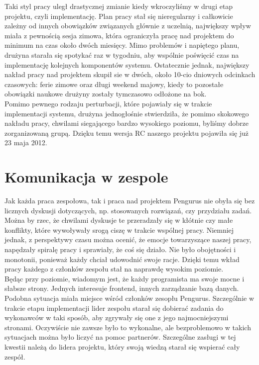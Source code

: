 \documentclass[licencjacka]{pracamgr}
\begin{document}
Taki styl pracy uległ drastycznej zmianie kiedy wkroczyliśmy w drugi etap projektu, czyli implementację.
Plan pracy stał się nieregularny i całkowicie zależny od innych obowiązków związanych głównie z uczelnią, 
największy wpływ miała z pewnością sesja zimowa, która ograniczyła pracę nad projektem do minimum na czas około dwóch miesięcy.
Mimo problemów i napiętego planu, drużyna starała się spotykać raz w tygodniu, aby wspólnie poświęcić czas na implementację 
kolejnych komponentów systemu. Ostatecznie jednak, największy nakład pracy nad projektem skupił sie w dwóch, około 10-cio dniowych odcinkach czasowych:
ferie zimowe oraz długi weekend majowy, kiedy to pozostałe obowiązki naukowe drużyny zostały tymczasowo odłożone na bok.\\

Pomimo pewnego rodzaju perturbacji, które pojawiały się w trakcie implementacji systemu, drużyna jednogłośnie stwierdziła,
że pomimo skokowego nakładu pracy, chwilami siegającego bardzo wysokiego poziomu, byliśmy dobrze zorganizowaną grupą.
Dzięku temu wersja RC naszego projektu pojawiła się już 23 maja 2012. 

\section{Komunikacja w zespole}
Jak każda praca zespołowa, tak i praca nad projektem Pengurus nie obyła się bez licznych dyskusji dotyczących, np. stosowanych rozwiązań, czy przydziału zadań.
Można by rzec, że chwilami dyskusje te przeradzały się w kłótnie czy małe konflikty, które wywoływały srogą ciszę w trakcie wspólnej pracy. 
Niemniej jednak, z perspektywy czasu można ocenić, że
emocje towarzyszące naszej pracy, napędzały spiralę pracy i sprawiały, że coś się działo. Nie było obojętności i monotonii, ponieważ każdy chciał udowodnić 
swoje racje. Dzięki temu wkład pracy każdego z członków zespołu stał na naprawdę wysokim poziomie.\\

Będąc przy poziomie, wiadomym jest, że każdy programista ma swoje mocne i słabsze strony. Jednych interesuje frontend, innych zarządzanie bazą danych. 
Podobna sytuacja miała miejsce wśród członków zesopłu Pengurus. Szczególnie w trakcie etapu implementacji lider zespołu starał się dobierać zadania do 
wykonawców w taki sposób, aby zgrywały się one z jego najmocniejszymi stronami. Oczywiście nie zawsze było to wykonalne, 
ale bezproblemowo w takich sytuacjach można było liczyć na pomoc partnerów. Szczególne zasługi w tej kwestii należą do lidera projektu, który swoją wiedzą 
starał się wspierać cały zespół.
\end{document}
